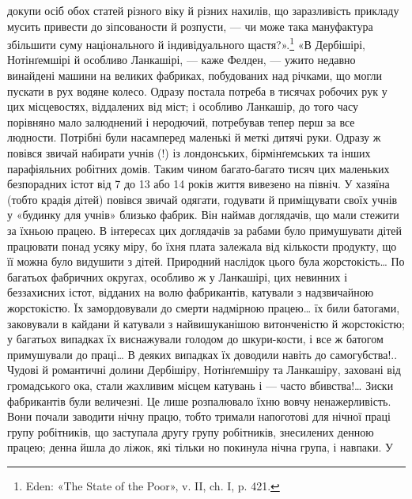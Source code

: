 \parcont{}  %
докупи осіб обох статей різного віку й різних нахилів, що заразливість прикладу мусить привести до
зіпсованости й розпусти, — чи може така мануфактура збільшити суму національного й індивідуального
щастя?».\footnote{
Eden: «The State of the Poor», v. II, ch. I, p. 421.
} «В Дербішірі, Нотінґемшірі й особливо
Ланкашірі, — каже Фелден, — ужито недавно винайдені машини на великих фабриках, побудованих над
річками, що могли пускати в рух водяне колесо. Одразу постала потреба в тисячах робочих рук у цих
місцевостях, віддалених від міст; і особливо
Ланкашір, до того часу порівняно мало залюднений і неродючий, потребував тепер перш за все людности.
Потрібні були насамперед маленькі й меткі дитячі руки. Одразу ж повівся звичай набирати учнів (!) із
лондонських, бірмінґемських та інших парафіяльних робітних домів. Таким чином багато-багато тисяч
цих маленьких безпорадних істот від 7 до 13 або 14 років життя вивезено на північ. У хазяїна (тобто
крадія дітей) повівся звичай одягати, годувати й приміщувати своїх учнів у «будинку для учнів»
близько фабрик. Він наймав доглядачів, що мали стежити за їхньою працею. В інтересах цих доглядачів
за рабами було примушувати дітей працювати понад усяку міру, бо їхня плата залежала від кількости
продукту, що її можна було видушити
з дітей. Природний наслідок цього була жорстокість\dots{} По багатьох фабричних округах, особливо ж у
Ланкашірі, цих невинних і беззахисних істот, відданих на волю фабрикантів, катували з надзвичайною
жорстокістю. Їх замордовували до смерти надмірною працею\dots{} їх били батогами, заковували в кайдани й
катували з найвишуканішою витонченістю й жорстокістю; у багатьох випадках їх виснажували голодом до
шкури-кости, і все ж батогом примушували до праці\dots{} В деяких випадках їх доводили навіть до
самогубства!.. Чудові й романтичні долини Дербішіру, Нотінґемшіру та Ланкашіру, заховані від
громадського ока, стали жахливим місцем катувань і — часто вбивства!\dots{} Зиски фабрикантів були
величезні. Це лише розпалювало їхню вовчу ненажерливість. Вони почали заводити нічну працю, тобто
тримали напоготові для нічної праці групу робітників, що заступала другу групу робітників,
знесилених денною працею; денна йшла до ліжок, які тільки но покинула нічна група, і навпаки. У
